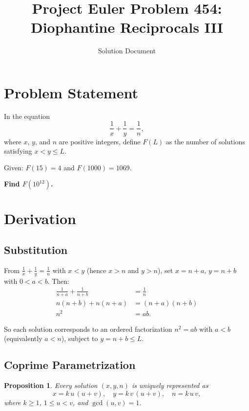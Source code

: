 \documentclass[11pt]{article}
\title{Project Euler Problem 454:\\Diophantine Reciprocals III}
\author{Solution Document}
\date{}
\newtheorem{proposition}[theorem]{Proposition}
\begin{document}
\maketitle

\section{Problem Statement}

In the equation
\[
\frac{1}{x} + \frac{1}{y} = \frac{1}{n},
\]
where $x$, $y$, and $n$ are positive integers, define $F(L)$ as the number of
solutions satisfying $x < y \leq L$.

Given: $F(15) = 4$ and $F(1000) = 1069$.

\textbf{Find $F(10^{12})$.}

\section{Derivation}

\subsection{Substitution}

From $\tfrac{1}{x} + \tfrac{1}{y} = \tfrac{1}{n}$ with $x < y$ (hence $x > n$
and $y > n$), set $x = n + a$, $y = n + b$ with $0 < a < b$. Then:
\begin{align*}
\frac{1}{n+a} + \frac{1}{n+b} &= \frac{1}{n} \\
n(n+b) + n(n+a) &= (n+a)(n+b) \\
n^2 &= ab.
\end{align*}

So each solution corresponds to an ordered factorization $n^2 = ab$ with $a < b$
(equivalently $a < n$), subject to $y = n + b \leq L$.

\subsection{Coprime Parametrization}

\begin{proposition}
Every solution $(x, y, n)$ is uniquely represented as
\[
x = k \, u \, (u+v), \quad y = k \, v \, (u+v), \quad n = k \, u \, v,
\]
where $k \geq 1$, $1 \leq u < v$, and $\gcd(u, v) = 1$.
\end{proposition}
\end{document}
